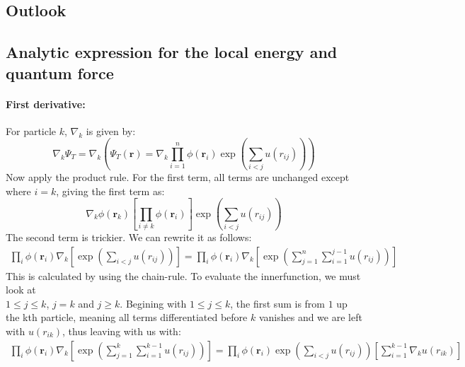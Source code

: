 \documentclass[a4paper, 10pt]{article}
\begin{document}
	\subsection{Outlook}
	
	
	\begin{appendices}
		\section{Analytic expression for the local energy and quantum force}\label{ap:analytic_expression_for_the_local_energy_and_quantum_force}
		\paragraph{First derivative:}
		For particle $k$, $\nabla_k$ is given by:
		\begin{equation}
		\nabla_k\Psi_{T} = \nabla_k\left(\Psi_T(\mathbf{r})=\nabla_k \prod_{i=1}^n\phi(\mathbf{r}_i)\exp\left(\sum_{i<j} u(r_{ij})\right)\right)
		\end{equation}
		Now apply the product rule. For the first term, all terms are unchanged except where $i=k$, giving the first term as:
		\begin{equation}
		\nabla_k \phi(\mathbf{r}_k)\left[ \prod_{i\neq k} \phi(\mathbf{r}_i)\right]\exp\left(\sum_{i<j}u(r_{ij})\right)
		\end{equation}
		The second term is trickier. We can rewrite it as follows:
		\begin{align}
		\prod_{i}\phi(\boldsymbol{r}_{i})\nabla_{k}\left[\exp\left(\sum_{i < j}u(r_{ij})\right)\right]
		= \prod_{i}\phi(\boldsymbol{r}_{i})\nabla_{k}\left[\exp\left(\sum_{j = 1}^{n}\sum_{i = 1}^{j-1}u(r_{ij})\right)\right]
		\label{second term in first derivative}
		\end{align}
		This is calculated by using the chain-rule. To evaluate the innerfunction, we must look
		at \\$1 \le j \le k$, $j = k$ and $j \ge k$. Begining with $1\le  j \le k$,
		the first sum is from $1$ up the kth particle, meaning all terms differentiated before $k$ vanishes
		and we are left with $u(r_{ik})$, thus leaving with us with:
		\begin{align}
		\prod_{i}\phi(\boldsymbol{r}_{i})\nabla_{k}\left[\exp\left(\sum_{j = 1}^{k}\sum_{i = 1}^{k-1}u(r_{ij})\right)\right]
		=
		\prod_{i}\phi(\boldsymbol{r}_{i})\exp{\left(\sum_{i<j}u(r_{ij})\right)}
		\left[\sum_{i = 1}^{k-1}\nabla_{k}u(r_{ik})\right]
		\end{align}

\end{appendices}
\end{document}
